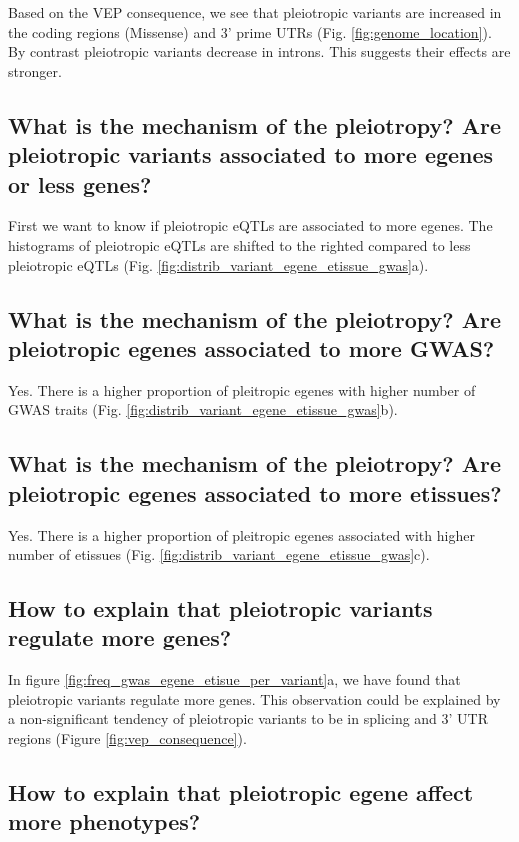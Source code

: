 Based on the VEP consequence, we see that pleiotropic variants are increased in the coding regions (Missense) and 3' prime UTRs (Fig. \ref{fig:genome_location}).
By contrast pleiotropic variants decrease in introns.
This suggests their effects are stronger.

\subsection*{What is the mechanism of the pleiotropy? Are pleiotropic variants associated to more egenes or less genes?}

First we want to know if pleiotropic eQTLs are associated to more egenes.
The histograms of pleiotropic eQTLs are shifted to the righted compared to less pleiotropic eQTLs (Fig. \ref{fig:distrib_variant_egene_etissue_gwas}a).

\subsection*{What is the mechanism of the pleiotropy? Are pleiotropic egenes associated to more GWAS?}

Yes. There is a higher proportion of pleitropic egenes with higher number of GWAS traits (Fig. \ref{fig:distrib_variant_egene_etissue_gwas}b).

\subsection*{What is the mechanism of the pleiotropy? Are pleiotropic egenes associated to more etissues?}

Yes. There is a higher proportion of pleitropic egenes associated with higher number of etissues (Fig. \ref{fig:distrib_variant_egene_etissue_gwas}c).

\subsection*{How to explain that pleiotropic variants regulate more genes?}

In figure \ref{fig:freq_gwas_egene_etisue_per_variant}a, we have found that pleiotropic variants regulate more genes.
This observation could be explained by a non-significant tendency of pleiotropic variants to be in splicing and 3' UTR regions (Figure \ref{fig:vep_consequence}).

\subsection*{How to explain that pleiotropic egene affect more phenotypes?}

